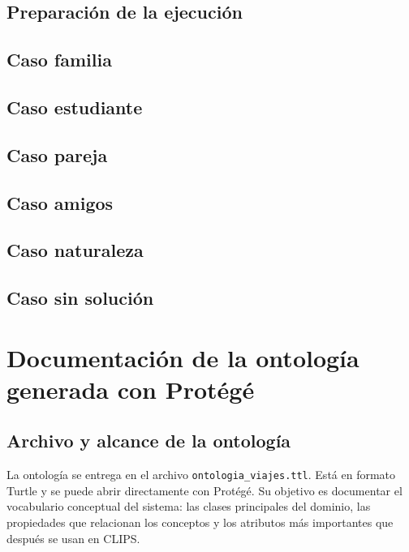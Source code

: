 \documentclass[11pt,a4paper]{article}
\begin{document}
\subsection{Preparaci\'on de la ejecuci\'on}


\subsection{Caso familia}


\subsection{Caso estudiante}


\subsection{Caso pareja}


\subsection{Caso amigos}


\subsection{Caso naturaleza}


\subsection{Caso sin soluci\'on}


\section{Documentaci\'on de la ontolog\'ia generada con Prot\'eg\'e}
\subsection{Archivo y alcance de la ontolog\'ia}
La ontolog\'ia se entrega en el archivo \texttt{ontologia\_viajes.ttl}. Est\'a en
formato Turtle y se puede abrir directamente con Prot\'eg\'e. Su objetivo es
documentar el vocabulario conceptual del sistema: las clases principales del
dominio, las propiedades que relacionan los conceptos y los atributos m\'as
importantes que despu\'es se usan en CLIPS.
\end{document}
